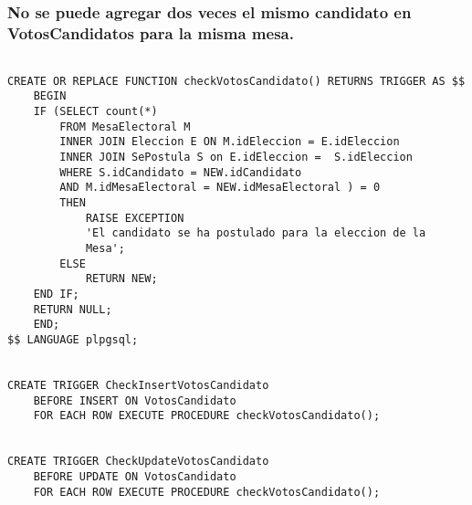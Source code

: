 \subsubsection{No se puede agregar dos veces el mismo candidato en VotosCandidatos para la misma mesa.}
\begin{verbatim}

CREATE OR REPLACE FUNCTION checkVotosCandidato() RETURNS TRIGGER AS $$
    BEGIN
    IF (SELECT count(*) 
        FROM MesaElectoral M 
        INNER JOIN Eleccion E ON M.idEleccion = E.idEleccion
        INNER JOIN SePostula S on E.idEleccion =  S.idEleccion
        WHERE S.idCandidato = NEW.idCandidato 
        AND M.idMesaElectoral = NEW.idMesaElectoral ) = 0
        THEN
            RAISE EXCEPTION 
            'El candidato se ha postulado para la eleccion de la 
            Mesa';              
        ELSE
            RETURN NEW;
    END IF;
    RETURN NULL;
    END;
$$ LANGUAGE plpgsql;


CREATE TRIGGER CheckInsertVotosCandidato
    BEFORE INSERT ON VotosCandidato
    FOR EACH ROW EXECUTE PROCEDURE checkVotosCandidato();


CREATE TRIGGER CheckUpdateVotosCandidato
    BEFORE UPDATE ON VotosCandidato
    FOR EACH ROW EXECUTE PROCEDURE checkVotosCandidato();

\end{verbatim}

